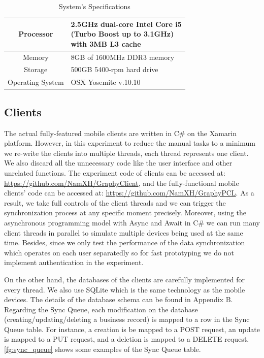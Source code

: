 \begin{table}[!ht]
\centering
\caption{System's Specifications}\label{tb:specs}
\begin{tabular}{ | c | l | }
\hline
	Processor & \specialcell{2.5GHz dual-core Intel Core i5\\(Turbo Boost up to 3.1GHz)\\with 3MB L3 cache} \\ \hline
	Memory & 8GB of 1600MHz DDR3 memory \\ \hline
	Storage & 500GB 5400-rpm hard drive \\ \hline
	Operating System & OSX Yosemite v.10.10\\ \hline
\end{tabular}
\end{table}

\subsection{Clients}
The actual fully-featured mobile clients are written in C\# on the Xamarin platform. However, in this experiment to reduce the manual tasks to a minimum we re-write the clients into multiple threads, each thread represents one client. We also discard all the unnecessary code like the user interface and other unrelated functions. The experiment code of clients can be accessed at: \url{https://github.com/NamXH/GraphyClient}, and the fully-functional mobile clients' code can be accessed at: \url{https://github.com/NamXH/GraphyPCL}. As a result, we take full controls of the client threads and we can trigger the synchronization process at any specific moment precisely. Moreover, using the asynchronous programming model with Async and Await in C\# we can run many client threads in parallel to simulate multiple devices being used at the same time. Besides, since we only test the performance of the data synchronization which operates on each user separatedly so for fast prototyping we do not implement authentication in the experiment.

On the other hand, the databases of the clients are carefully implemented for every thread. We also use SQLite which is the same technology as the mobile devices. The details of the database schema can be found in Appendix B. Regarding the Sync Queue, each modification on the database (creating/updating/deleting a business record) is mapped to a row in the Sync Queue table. For instance, a creation is be mapped to a POST request, an update is mapped to a PUT request, and a deletion is mapped to a DELETE request. \autoref{fg:sync_queue} shows some examples of the Sync Queue table.

